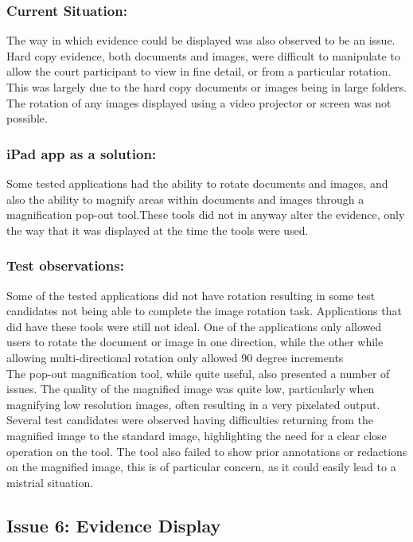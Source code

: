 \subsubsection{Current Situation:}
The way in which evidence could be displayed was also observed to be an issue. Hard copy evidence, both documents and images, were difficult to manipulate to allow the court participant to view in fine detail, or from a particular rotation. This was largely due to the hard copy documents or images being in large folders. The rotation of any images displayed using a video projector or screen was not possible.\\
\subsubsection{iPad app as a solution:}
Some tested applications had the ability to rotate documents and images, and also the ability to magnify areas within documents and images through a magnification pop-out tool.These tools did not in anyway alter the evidence, only the way that it was displayed at the time the tools were used.\\
\subsubsection{Test observations:}
Some of the tested applications did not have rotation resulting in some test candidates not being able to complete the image rotation task. Applications that did have these tools were still not ideal. One of the applications only allowed users to rotate the document or image in one direction, while the other while allowing multi-directional rotation only allowed 90 degree increments\\
The pop-out magnification tool, while quite useful, also presented a number of issues. The quality of the magnified image was quite low, particularly when magnifying low resolution images, often resulting in a very pixelated output. Several test candidates were observed having difficulties returning from the magnified image to the standard image, highlighting the need for a clear close operation on the tool. The tool also failed to show prior annotations or redactions on the magnified image, this is of particular concern, as it could easily lead to a mistrial situation.

\subsection{Issue 6: Evidence Display}

